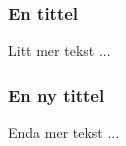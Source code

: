 \documentclass[norsk]{beamer}
\begin{document}
\begin{frame}
  \frametitle{En tittel}
  Litt mer tekst ...
\end{frame}

\begin{frame}
  \frametitle{En ny tittel}
  Enda mer tekst ...
\end{frame}
\end{document}
